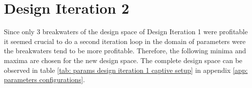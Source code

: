 \section{Design Iteration 2}



Since only 3 breakwaters of the design space of Design Iteration 1 were profitable it seemed crucial to do a second iteration loop in the domain of parameters were the breakwaters tend to be more profitable. Therefore, the following minima and maxima are chosen for the new design space. The complete design space can be observed in table \ref{tab: params design iteration 1 captive setup} in appendix \ref{app: parameters configurations}.


\begin{table}[]
\centering
{}
\caption{Boundaries Design Space Captive Design Iteration 2 Costs}
\label{tab: boundaries DI2 costs}
\end{table}